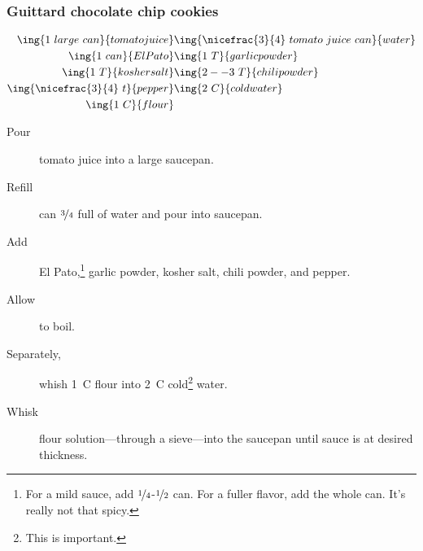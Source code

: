 \subsubsection{Guittard chocolate chip cookies}

\begin{align*}
    \ing{1~large~can}{tomato juice} & \ing{\nicefrac{3}{4}~tomato~juice~can}{water} \\
    \ing{1~can}{El Pato}            & \ing{1~T}{garlic powder}                      \\
    \ing{1~T}{kosher salt}          & \ing{2--3~T}{chili powder}                    \\
    \ing{\nicefrac{3}{4}~t}{pepper} & \ing{2~C}{cold water}                         \\
    \ing{1~C}{flour}
\end{align*}

\begin{description}
    \item[Pour]tomato juice into a large saucepan.
    \item[Refill]can $\nicefrac{3}{4}$ full of water and pour into saucepan.
    \item[Add]El Pato,\footnote{For a mild sauce, add $\nicefrac{1}{4}$-$\nicefrac{1}{2}$ can. For a fuller flavor, add the whole can. It's really not that spicy.} garlic powder, kosher salt, chili powder, and pepper.
    \item[Allow]to boil.
    \item[Separately,]whish 1~C flour into 2~C cold\footnote{This is important.} water.
    \item[Whisk]flour solution---through a sieve---into the saucepan until sauce is at desired thickness.
\end{description}

\pagebreak
